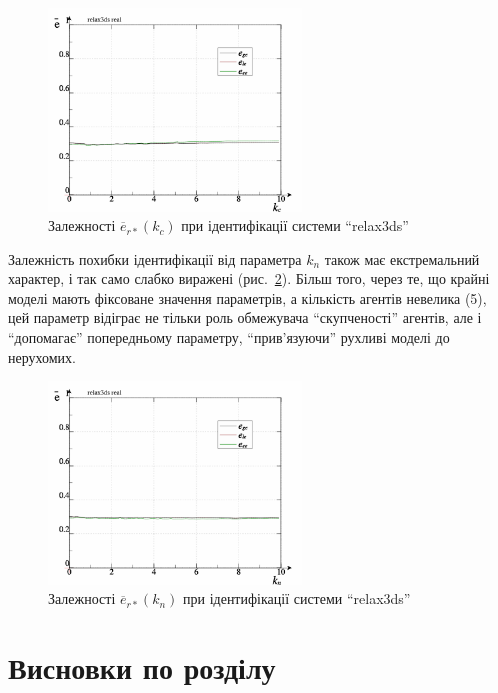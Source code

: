 \begin{figure}[htb!]
  \centerline{\includegraphics[width=0.6\textwidth]{p/relax3ds_read_id2_prm_0-p_k_cl.png} }
  \caption{Залежності $\overline{e}_{r *} (k_c) $ при ідентифікації системи ``relax3ds''}
  \label{atu:f:relax3ds_read_id2_prm_0-p_k_c}
\end{figure}

Залежність похибки ідентифікації від параметра
$k_n$ також має екстремальний характер, і так само слабко виражені
(рис.~\ref{atu:f:relax3ds_read_id2_prm_0-p_k_n}). Більш того, через те, що крайні
моделі мають фіксоване значення параметрів, а кількість агентів
невелика (5), цей параметр відіграє не тільки роль обмежувача
``скупченості'' агентів, але і ``допомагає'' попередньому
параметру, ``прив'язуючи'' рухливі моделі до нерухомих.


\begin{figure}[htb!]
  \centerline{\includegraphics[width=0.6\textwidth]{p/relax3ds_read_id2_prm_0-p_k_cn.png} }
  \caption{Залежності $ \overline{e}_{r *} (k_n) $ при ідентифікації системи ``relax3ds''}
  \label{atu:f:relax3ds_read_id2_prm_0-p_k_n}
\end{figure}

\section{Висновки по розділу \thechapter}

